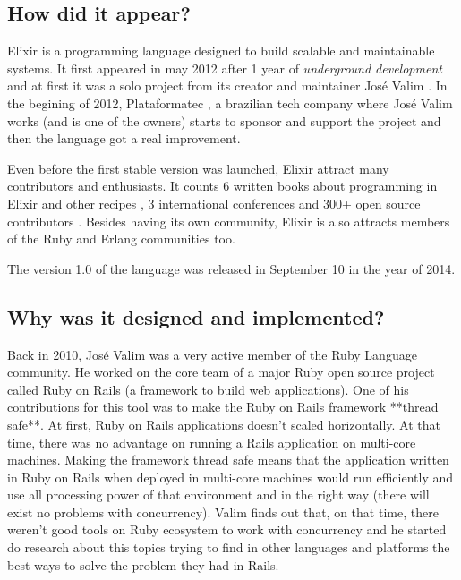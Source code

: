 
\subsection{How did it appear?}

Elixir \cite{5_1} is a programming language
designed to build scalable and maintainable systems. It first appeared in may
2012 after 1 year of \textit{underground development} and at first it was a solo
project from its creator and maintainer José
Valim \cite{5_2}. In the begining of 2012,
Plataformatec \cite{5_3}, a brazilian tech company
where José Valim works (and is one of the owners) starts to sponsor and support
the project and then the language got a real improvement\cite{brown1998chemoinformatics}.

Even before the first stable version was launched, Elixir attract many
contributors and enthusiasts. It counts 6 written books about programming in
Elixir and other recipes \cite{5_4}, 3
international conferences \cite{5_5} and 300+
open source contributors \cite{5_6}. Besides having
its own community, Elixir is also attracts members of the Ruby and Erlang
communities too.

The version 1.0 of the language \cite{5_7} was
released in September 10 in the year of 2014.

\subsection{Why was it designed and implemented?}

Back in 2010, José Valim was a very active member of the Ruby
Language \cite{5_8} community. He worked on the
core team of a major Ruby open source project called Ruby on
Rails \cite{5_9} (a framework to build web
applications). One of his contributions for this tool was to make the Ruby on
Rails framework **thread safe**. At first, Ruby on Rails applications doesn't
scaled horizontally. At that time, there was no advantage on running a Rails
application on multi-core machines. Making the framework thread safe means that
the application written in Ruby on Rails when deployed in multi-core machines
would run efficiently and use all processing power of that environment and in
the right way (there will exist no problems with concurrency). Valim finds out
that, on that time, there weren't good tools on Ruby ecosystem to work with
concurrency and he started do research about this topics trying to find in other
languages and platforms the best ways to solve the problem they had in Rails.

